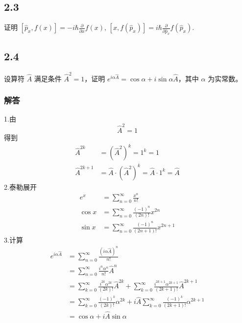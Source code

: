 \subsection{2.3}
证明 $[\hat{p}_x, f(x)] = -i\hbar \frac{\partial}{\partial x} f(x)$, $[x, f(\hat{p}_x)] = i\hbar \frac{\partial}{\partial \hat{p}_x} f(\hat{p}_x)$.

\newpage
\subsection{2.4}
设算符 $\hat{A}$ 满足条件 $\hat{A}^2 = 1$，证明 $e^{i\alpha \hat{A}} = \cos \alpha + i \sin \alpha \hat{A}$，其中 $\alpha$ 为实常数。

\subsubsection{解答}
1.由
\begin{equation}
    \hat{A}^2=1
\end{equation}
得到
\begin{equation}
    \begin{aligned}
        \hat{A}^{2k}&=(\hat{A}^2)^k=1^k=1
\\
\hat{A}^{2k+1}&=\hat{A}\cdot (\hat{A}^2)^k=\hat{A}\cdot 1^k=\hat{A}
    \end{aligned}
\end{equation}
2.泰勒展开
\begin{equation}
    \begin{aligned}
        e^x&=\sum_{n=0}^{\infty}{\frac{x^n}{n!}}
\\
\cos x&=\sum_{n=0}^{\infty}{\frac{\left( -1 \right) ^n}{\left( 2n \right) !}}x^{2n}
\\
\sin x&=\sum_{n=0}^{\infty}{\frac{\left( -1 \right) ^n}{\left( 2n+1 \right) !}}x^{2n+1}
    \end{aligned}
\end{equation}
3.计算
\begin{equation}
    \begin{aligned}
        e^{i\alpha \hat{A}}&=\sum_{n=0}^{\infty}{\frac{(i\alpha \hat{A})^n}{n!}}
\\
&=\sum_{n=0}^{\infty}{\frac{i^n\alpha ^n}{n!}}\hat{A}^n
\\
&=\sum_{k=0}^{\infty}{\frac{i^{2k}\alpha ^{2k}}{\left( 2k \right) !}}\hat{A}^{2k}+\sum_{k=0}^{\infty}{\frac{i^{2k+1}\alpha ^{2k+1}}{\left( 2k+1 \right) !}}\hat{A}^{2k+1}
\\
&=\sum_{k=0}^{\infty}{\frac{\left( -1 \right) ^k}{\left( 2k \right) !}}\alpha ^{2k}+i\hat{A}\sum_{k=0}^{\infty}{\frac{\left( -1 \right) ^k}{\left( 2k+1 \right) !}}\alpha ^{2k+1}
\\
&=\cos \alpha +i\hat{A}\sin \alpha 
    \end{aligned}
\end{equation}

